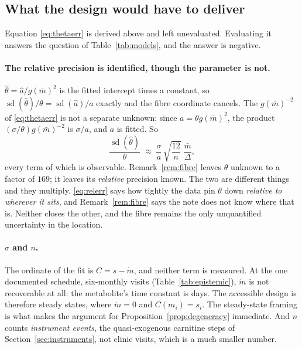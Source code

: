 \subsection{What the design would have to deliver}
\label{sec:design}

Equation \eqref{eq:thetaerr} is derived above and left unevaluated. Evaluating it
answers the question of Table~\ref{tab:models}, and the answer is negative.

\paragraph{The relative precision is identified, though the parameter is not.}
$\hat\theta = \hat a/g(\bar m)^2$ is the fitted intercept times a constant, so
$\operatorname{sd}(\hat\theta)/\theta = \operatorname{sd}(\hat a)/a$ exactly and the fibre
coordinate cancels. The $g(\bar m)^{-2}$ of \eqref{eq:thetaerr} is not a separate unknown:
since $a = \theta g(\bar m)^2$, the product $(\sigma/\theta)g(\bar m)^{-2}$ is $\sigma/a$,
and $a$ is fitted. So
\begin{equation}
\frac{\operatorname{sd}(\hat\theta)}{\theta} \;\approx\;
\frac{\sigma}{a}\,\sqrt{\frac{12}{n}}\;\frac{\bar m}{\Delta},
\label{eq:relerr}
\end{equation}
every term of which is observable. Remark~\ref{rem:fibre} leaves $\theta$ unknown to a
factor of $169$; it leaves its \emph{relative} precision known. The two are different
things and they multiply. \eqref{eq:relerr} says how tightly the data pin $\theta$ down
\emph{relative to wherever it sits}, and Remark~\ref{rem:fibre} says the note does not know
where that is. Neither closes the other, and the fibre remains the only unquantified
uncertainty in the location.

\paragraph{$\sigma$ and $n$.} The ordinate of the fit is $C = s - \dot m$, and
neither term is measured. At the one documented schedule, six-monthly visits
(Table~\ref{tab:epistemic}), $\dot m$ is not recoverable at all: the metabolite's time
constant is days. The accessible design is therefore steady states, where $\dot m = 0$ and
$C(m_i) = s_i$. The steady-state framing is what makes the argument for
Proposition~\ref{prop:degeneracy} immediate. And $n$ counts \emph{instrument events}, the
quasi-exogenous carnitine steps of Section~\ref{sec:instruments}, not clinic visits, which
is a much smaller number.

